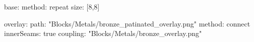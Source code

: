 base:
  method: repeat
  size: [8,8]
  
overlay:
  path: "Blocks/Metals/bronze_patinated_overlay.png"
  method: connect
  innerSeams: true
  coupling: "Blocks/Metals/bronze_overlay.png"